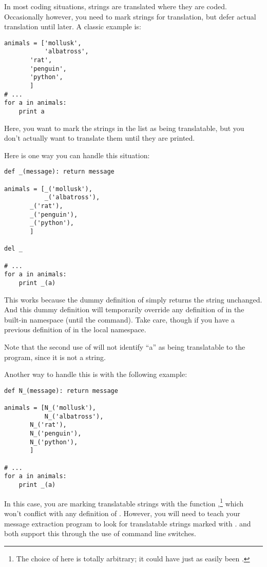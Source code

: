 In most coding situations, strings are translated where they are coded.
Occasionally however, you need to mark strings for translation, but
defer actual translation until later.  A classic example is:

\begin{verbatim}
animals = ['mollusk',
           'albatross',
	   'rat',
	   'penguin',
	   'python',
	   ]
# ...
for a in animals:
    print a
\end{verbatim}

Here, you want to mark the strings in the  list as being
translatable, but you don't actually want to translate them until they
are printed.

Here is one way you can handle this situation:

\begin{verbatim}
def _(message): return message

animals = [_('mollusk'),
           _('albatross'),
	   _('rat'),
	   _('penguin'),
	   _('python'),
	   ]

del _

# ...
for a in animals:
    print _(a)
\end{verbatim}

This works because the dummy definition of \function{_()} simply returns
the string unchanged.  And this dummy definition will temporarily
override any definition of \function{_()} in the built-in namespace
(until the  command).
Take care, though if you have a previous definition of \function{_} in
the local namespace.

Note that the second use of \function{_()} will not identify ``a'' as
being translatable to the  program, since it is not
a string.

Another way to handle this is with the following example:

\begin{verbatim}
def N_(message): return message

animals = [N_('mollusk'),
           N_('albatross'),
	   N_('rat'),
	   N_('penguin'),
	   N_('python'),
	   ]

# ...
for a in animals:
    print _(a)
\end{verbatim}

In this case, you are marking translatable strings with the function
,\footnote{The choice of  here is totally
arbitrary; it could have just as easily been
.
} which won't conflict with any definition of
\function{_()}.  However, you will need to teach your message extraction
program to look for translatable strings marked with .
 and  both support this through the
use of command line switches.

